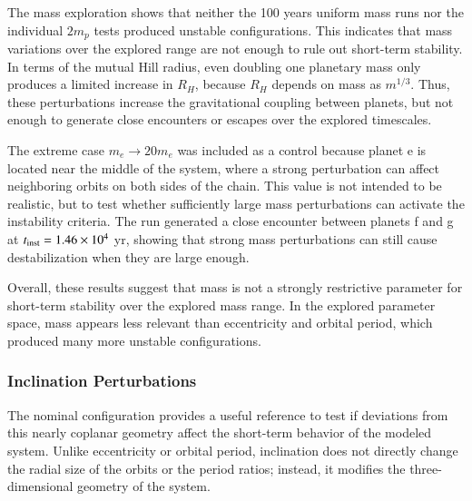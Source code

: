 \documentclass{aa}
\begin{document}
The mass exploration shows that neither the 100 years uniform mass runs nor the individual $2m_p$ tests produced unstable configurations. This indicates that mass variations over the explored range are not enough to rule out short-term stability. In terms of the mutual Hill radius, even doubling one planetary mass only produces a limited increase in $R_H$, because $R_H$ depends on mass as $m^{1/3}$. Thus, these perturbations increase the gravitational coupling between planets, but not enough to generate close encounters or escapes over the explored timescales.

The extreme case $m_e\rightarrow20m_e$ was included as a control because planet e is located near the middle of the system, where a strong perturbation can affect neighboring orbits on both sides of the chain. This value is not intended to be realistic, but to test whether sufficiently large mass perturbations can activate the instability criteria. The run generated a close encounter between planets f and g at $t_{\rm inst}=1.46\times10^4$ yr, showing that strong mass perturbations can still cause destabilization when they are large enough.

Overall, these results suggest that mass is not a strongly restrictive parameter for short-term stability over the explored mass range. In the explored parameter space, mass appears less relevant than eccentricity and orbital period, which produced many more unstable configurations.
 
\subsubsection{Inclination Perturbations}

The nominal configuration provides a useful reference to test if deviations from this nearly coplanar geometry affect the short-term behavior of the modeled system. Unlike eccentricity or orbital period, inclination does not directly change the radial size of the orbits or the period ratios; instead, it modifies the three-dimensional geometry of the system.
\end{document}

